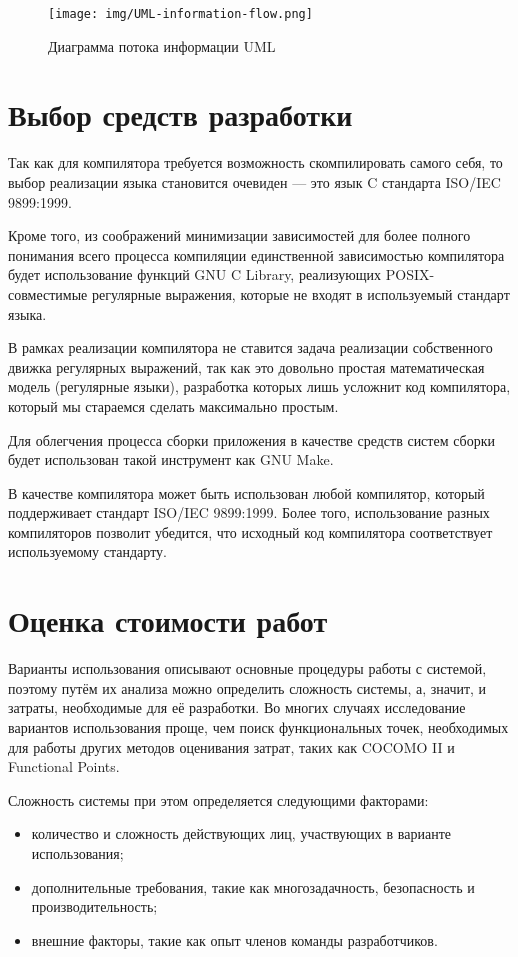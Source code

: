 \documentclass[14pt,russian]{extarticle}
\begin{document}
\begin{figure}[H]
	\centering
	\texttt{[image: img/UML-information-flow.png]}
	\caption{Диаграмма потока информации UML}
\end{figure}

\clearpage
\section{Выбор средств разработки}

Так как для компилятора требуется возможность скомпилировать самого себя, то
выбор реализации языка становится очевиден --- это язык C стандарта ISO/IEC
9899:1999.

Кроме того, из соображений минимизации зависимостей для более полного понимания
всего процесса компиляции единственной зависимостью компилятора будет
использование функций GNU C Library, реализующих POSIX-совместимые регулярные
выражения, которые не входят в используемый стандарт языка.

В рамках реализации компилятора не ставится задача реализации собственного
движка регулярных выражений, так как это довольно простая математическая модель
(регулярные языки), разработка которых лишь усложнит код компилятора, который мы
стараемся сделать максимально простым.

Для облегчения процесса сборки приложения в качестве средств систем сборки будет
использован такой инструмент как GNU Make.

В качестве компилятора может быть использован любой компилятор, который
поддерживает стандарт ISO/IEC 9899:1999. Более того, использование разных
компиляторов позволит убедится, что исходный код компилятора соответствует
используемому стандарту.

\clearpage
\section{Оценка стоимости работ}

Варианты использования описывают основные процедуры работы с системой, поэтому
путём их анализа можно определить сложность системы, а, значит, и затраты,
необходимые для её разработки. Во многих случаях исследование вариантов
использования проще, чем поиск функциональных точек, необходимых для работы
других методов оценивания затрат, таких как COCOMO II и Functional Points.

Сложность системы при этом определяется следующими факторами:

\begin{itemize}
	\item количество и сложность действующих лиц, участвующих в варианте использования;

	\item дополнительные требования, такие как многозадачность, безопасность и
		производительность;

	\item внешние факторы, такие как опыт членов команды разработчиков.
\end{itemize}
\end{document}
